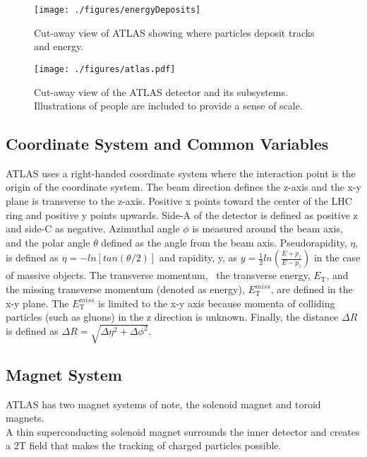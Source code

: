 \begin{figure}[h!]
  \centering
	\texttt{[image: ./figures/energyDeposits]}
\caption{\label{fig:energyDeposits}{ Cut-away view of ATLAS showing where particles deposit tracks and energy. }} %
\end{figure}


\begin{figure}[h!]
  \centering
	\texttt{[image: ./figures/atlas.pdf]}
\caption{\label{fig:atlas}{ Cut-away view of the ATLAS detector and its subsystems.  Illustrations of people are included to provide a sense of scale. }} %
\end{figure}


\subsection{Coordinate System and Common Variables}

ATLAS uses a right-handed coordinate system where the interaction point is the origin of the coordinate system.  The beam direction defines the z-axis and the x-y plane is transverse to the z-axis.  Positive x points toward the center of the LHC ring and positive y points upwards.  Side-A of the detector is defined as positive z and side-C as negative.  Azimuthal angle $\phi$ is measured around the beam axis, and the polar angle $\theta$ defined as the angle from the beam axis.  Pseudorapidity, $\eta$, is defined as $\eta = -ln[tan(\theta/2)]$ and rapidity, y, as $y=\frac{1}{2} ln(\frac{E+p_{z}}{E-p_{z}})$ in the case of massive objects.  The transverse momentum, \pt\,  the transverse energy, $E_{\mathrm{T}}$, and the missing transverse momentum (denoted as energy), $E_{\mathrm{T}}^{miss}$, are defined in the x-y plane.  The $E_{\mathrm{T}}^{miss}$ is limited to the x-y axis because momenta of colliding particles (such as gluons) in the z direction is unknown.  Finally, the distance $\Delta R$ is defined as $\Delta R = \sqrt{\Delta\eta^{2} + \Delta\phi^{2}}$.\\

\subsection{Magnet System}

ATLAS has two magnet systems of note, the solenoid magnet and toroid magnets.\\

A thin superconducting solenoid magnet surrounds the inner detector and creates a 2T field that makes the tracking of charged particles possible.  \\

